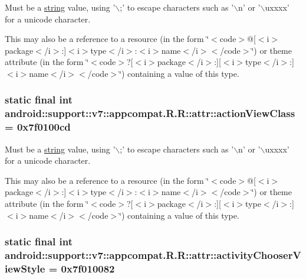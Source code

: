 Must be a \hyperlink{classandroid_1_1support_1_1v7_1_1appcompat_1_1_r_1_1string}{string} value, using '$\backslash$;' to escape characters such as '$\backslash$n' or '$\backslash$uxxxx' for a unicode character. 

This may also be a reference to a resource (in the form \char`\"{}$<$code$>$@\mbox{[}$<$i$>$package$<$/i$>$:\mbox{]}$<$i$>$type$<$/i$>$:$<$i$>$name$<$/i$>$$<$/code$>$\char`\"{}) or theme attribute (in the form \char`\"{}$<$code$>$?\mbox{[}$<$i$>$package$<$/i$>$:\mbox{]}\mbox{[}$<$i$>$type$<$/i$>$:\mbox{]}$<$i$>$name$<$/i$>$$<$/code$>$\char`\"{}) containing a value of this type. \hypertarget{classandroid_1_1support_1_1v7_1_1appcompat_1_1_r_1_1attr_6850242e2fa209c92c0b93c0248eb886}{
\subsubsection[{actionViewClass}]{\setlength{\rightskip}{0pt plus 5cm}static final int android::support::v7::appcompat.R.R::attr::actionViewClass = 0x7f0100cd}}
\label{classandroid_1_1support_1_1v7_1_1appcompat_1_1_r_1_1attr_6850242e2fa209c92c0b93c0248eb886}


Must be a \hyperlink{classandroid_1_1support_1_1v7_1_1appcompat_1_1_r_1_1string}{string} value, using '$\backslash$;' to escape characters such as '$\backslash$n' or '$\backslash$uxxxx' for a unicode character. 

This may also be a reference to a resource (in the form \char`\"{}$<$code$>$@\mbox{[}$<$i$>$package$<$/i$>$:\mbox{]}$<$i$>$type$<$/i$>$:$<$i$>$name$<$/i$>$$<$/code$>$\char`\"{}) or theme attribute (in the form \char`\"{}$<$code$>$?\mbox{[}$<$i$>$package$<$/i$>$:\mbox{]}\mbox{[}$<$i$>$type$<$/i$>$:\mbox{]}$<$i$>$name$<$/i$>$$<$/code$>$\char`\"{}) containing a value of this type. \hypertarget{classandroid_1_1support_1_1v7_1_1appcompat_1_1_r_1_1attr_7bccde73f689896d79a5b7161977ab26}{
\subsubsection[{activityChooserViewStyle}]{\setlength{\rightskip}{0pt plus 5cm}static final int android::support::v7::appcompat.R.R::attr::activityChooserViewStyle = 0x7f010082}}
\label{classandroid_1_1support_1_1v7_1_1appcompat_1_1_r_1_1attr_7bccde73f689896d79a5b7161977ab26}


